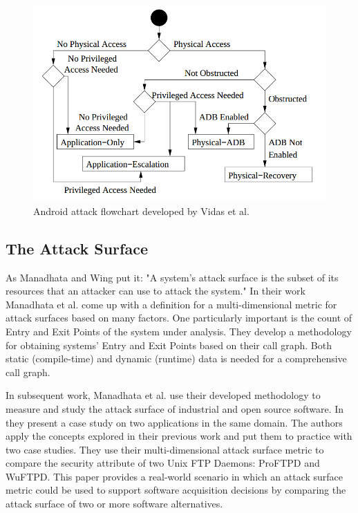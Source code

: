 \documentclass[conference]{IEEEtran}
\begin{document}
\begin{figure}
  \centering
  \includegraphics[scale=0.30]{figs/attackflow.png}
  \caption{Android attack flowchart developed by Vidas et al.}
  \label{fig:attackflow}
\end{figure}

\subsection{The Attack Surface}

As Manadhata and Wing \cite{Manadhata2011AnAttackSurfaceMetric} put it: "A system's attack surface is the subset of its resources that an attacker can use to attack the system." In their work Manadhata et al. \cite{Manadhata2011AnAttackSurfaceMetric} come up with a definition for a multi-dimensional metric for attack surfaces based on many factors. One particularly important is the count of Entry and Exit Points of the system under analysis. They develop a methodology for obtaining systems' Entry and Exit Points based on their call graph. Both static (compile-time) and dynamic (runtime) data is needed for a comprehensive call graph.

In subsequent work, Manadhata et al. \cite{manadhata_measuring_2006} \cite{manadhata2009report} use their developed methodology to measure and study the attack surface of industrial and open source software. In  \cite{manadhata_measuring_2006} they present a case study on two applications in the same domain. The authors apply the concepts explored in their previous work and put them to practice with two case studies. They use their multi-dimensional attack surface metric to compare the security attribute of two Unix FTP Daemons: ProFTPD and WuFTPD. This paper provides a real-world scenario in which an attack surface metric could be used to support software acquisition decisions by comparing the attack surface of two or more software alternatives.
\end{document}
